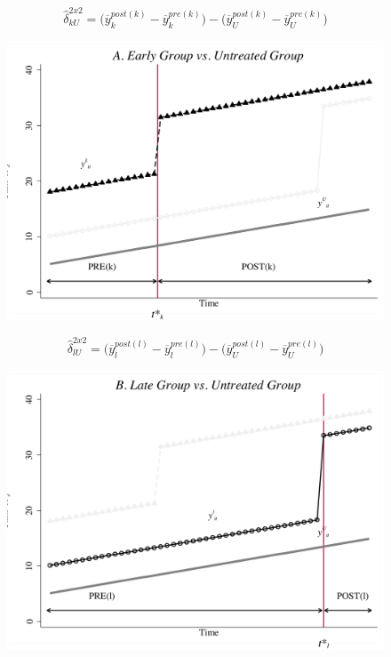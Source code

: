 \documentclass{beamer}
\begin{document}
\begin{frame}[plain]
$$\widehat{\delta}^{2x2}_{kU} = \bigg ( \overline{y}_k^{post(k)} - \overline{y}_k^{pre(k)} \bigg ) - \bigg ( \overline{y}_U^{post(k)} - \overline{y}_U^{pre(k)} \bigg ) $$
	\begin{figure}
	\includegraphics[scale=0.45]{./lecture_includes/bacon_goodman_3.png}
	\end{figure}

\end{frame}

\begin{frame}[plain]
$$\widehat{\delta}^{2x2}_{lU} = \bigg ( \overline{y}_l^{post(l)} - \overline{y}_l^{pre(l)} \bigg ) - \bigg ( \overline{y}_U^{post(l)} - \overline{y}_U^{pre(l)} \bigg ) $$
	\begin{figure}
	\includegraphics[scale=0.45]{./lecture_includes/bacon_goodman_4.png}
	\end{figure}

\end{frame}
\end{document}
